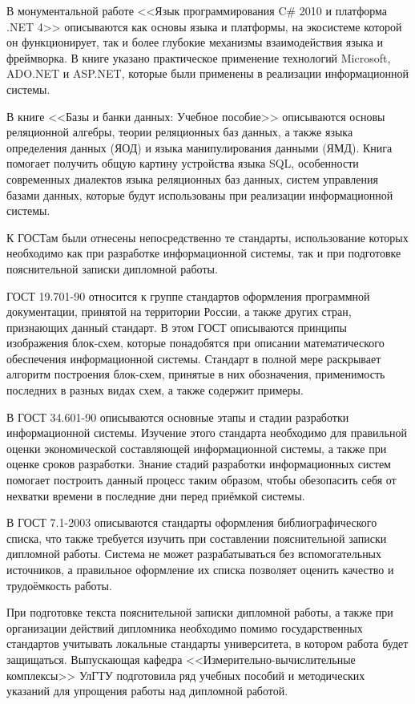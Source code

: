 В монументальной работе <<Язык программирования C\# 2010 и платформа .NET 4>> описываются как основы языка и платформы, на экосистеме которой он функционирует, так и более глубокие механизмы взаимодействия языка и фреймворка.
В книге указано практическое применение технологий Microsoft, ADO.NET и ASP.NET, которые были применены в реализации информационной системы.

В книге <<Базы и банки данных: Учебное пособие>> описываются основы реляционной алгебры, теории реляционных баз данных, а также языка определения данных (ЯОД) и языка манипулирования данными (ЯМД).
Книга помогает получить общую картину устройства языка SQL, особенности современных диалектов языка реляционных баз данных, систем управления базами данных, которые будут использованы при реализации информационной системы.

К ГОСТам были отнесены непосредственно те стандарты, использование которых необходимо как при разработке информационной системы, так и при подготовке пояснительной записки дипломной работы.

ГОСТ 19.701-90 относится к группе стандартов оформления программной документации, принятой на территории России, а также других стран, признающих данный стандарт.
В этом ГОСТ описываются принципы изображения блок-схем, которые понадобятся при описании математического обеспечения информационной системы.
Стандарт в полной мере раскрывает алгоритм построения блок-схем, принятые в них обозначения, применимость последних в разных видах схем, а также содержит примеры.

В ГОСТ 34.601-90 описываются основные этапы и стадии разработки информационной системы.
Изучение этого стандарта необходимо для правильной оценки экономической составляющей информационной системы, а также при оценке сроков разработки.
Знание стадий разработки информационных систем помогает построить данный процесс таким образом, чтобы обезопасить себя от нехватки времени в последние дни перед приёмкой системы.

В ГОСТ 7.1-2003 описываются стандарты оформления библиографического списка, что также требуется изучить при составлении пояснительной записки дипломной работы.
Система не может разрабатываться без вспомогательных источников, а правильное оформление их списка позволяет оценить качество и трудоёмкость работы.

При подготовке текста пояснительной записки дипломной работы, а также при организации действий дипломника необходимо помимо государственных стандартов учитывать локальные стандарты университета, в котором работа будет защищаться.
Выпускающая кафедра <<Измерительно-вычислительные комплексы>> УлГТУ подготовила ряд учебных пособий и методических указаний для упрощения работы над дипломной работой.

